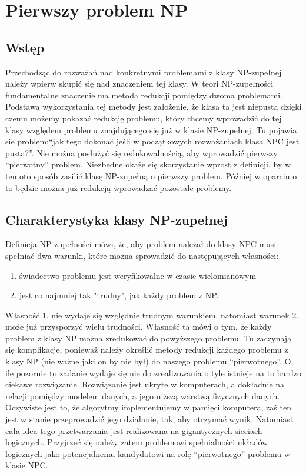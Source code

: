 \long{}
\chapter{Pierwszy problem NP}

\section{Wstęp}

Przechodząc do rozważań nad konkretnymi problemami z klasy NP-zupełnej należy wpierw skupić się nad znaczeniem tej klasy. W teori NP-zupełności fundamentalne znaczenie ma metoda redukcji pomiędzy dwoma problemami. Podstawą wykorzystania tej metody jest założenie, że klasa ta jest niepusta dzięki czemu możemy pokazać redukcję problemu, który chcemy wprowadzić do tej klasy względem problemu znajdującego się już w klasie NP-zupełnej. Tu pojawia sie problem:“jak tego dokonać jeśli w początkowych rozważaniach klasa NPC jest pusta?”. Nie można posłużyć się redukowalnością, aby wprowadzić pierwszy “pierwotny” problem. Niezbędne okaże się skorzystanie wprost z definicji, by w ten oto sposób zasilić klasę NP-zupełną o pierwszy problem. Później w oparciu o to będzie można już redukcją wprowadzać pozostałe problemy. 

\section{Charakterystyka klasy NP-zupełnej}

Definicja NP-zupełności mówi, że, aby problem należał do klasy NPC musi spełniać dwa warunki, które można sprowadzić do następujących własności:
\begin{enumerate}
\item świadectwo problemu jest weryfikowalne w czasie wielomianowym
\item jest co najmniej tak "trudny", jak każdy problem z NP.
\end{enumerate}

Własność 1. nie wydaje się względnie trudnym warunkiem, natomiast warunek 2. może już przysporzyć wielu trudności. Własność ta mówi o tym, że każdy problem z klasy NP można zredukować do powyższego problemu. Tu zaczynają się komplikacje, ponieważ należy określić metody redukcji każdego problemu z klasy NP (nie ważne jaki on by nie był) do naszego problemu “pierwotnego”. O ile pozornie to zadanie wydaje się nie do zrealizowania o tyle istnieje na to bardzo ciekawe rozwiązanie. Rozwiązanie jest ukryte w komputerach, a dokładnie na relacji pomiędzy modelem danych, a jego niższą warstwą fizycznych danych. Oczywiste jest to, że algorytmy implementujemy w pamięci komputera, zaś ten jest w stanie przeprowadzić jego działanie, tak, aby otrzymać wynik. Natomiast cała idea tego przetwarzania jest realizowana na gigantycznych sieciach logicznych. Przyjrzeć się należy zatem problemowi spełnialności układów logicznych jako potencjalnemu kandydatowi na rolę “pierwotnego” problemu w klasie NPC.

